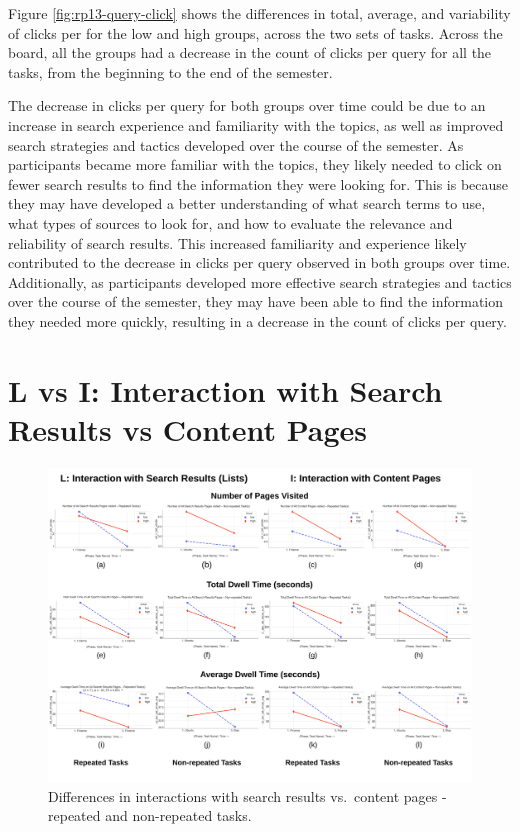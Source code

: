 \documentclass[letterpaper, nobind]{templates/ociamthesis}
\begin{document}
Figure \ref{fig:rp13-query-click} shows the differences in total, average, and variability of clicks per for the low and high groups, across the two sets of tasks.
Across the board, all the groups had a decrease in the count of clicks per query for all the tasks, from the beginning to the end of the semester.

The decrease in clicks per query for both groups over time could be due to an increase in search experience and familiarity with the topics, as well as improved search strategies and tactics developed over the course of the semester.
As participants became more familiar with the topics, they likely needed to click on fewer search results to find the information they were looking for. This is because they may have developed a better understanding of what search terms to use, what types of sources to look for, and how to evaluate the relevance and reliability of search results.
This increased familiarity and experience likely contributed to the decrease in clicks per query observed in both groups over time.
Additionally, as participants developed more effective search strategies and tactics over the course of the semester, they may have been able to find the information they needed more quickly, resulting in a decrease in the count of clicks per query.

\hypertarget{l-vs-i-interaction-with-search-results-vs-content-pages}{%
\section{L vs I: Interaction with Search Results vs Content Pages}\label{l-vs-i-interaction-with-search-results-vs-content-pages}}

\begin{figure}

{\centering \includegraphics[width=1\linewidth]{figs/rp13-lvi} 

}

\caption[Differences in interactions with search results vs.~content pages - repeated and non-repeated tasks.]{Differences in interactions with search results vs.~content pages - repeated and non-repeated tasks.}\label{fig:rp13-lvi}
\end{figure}
\end{document}
